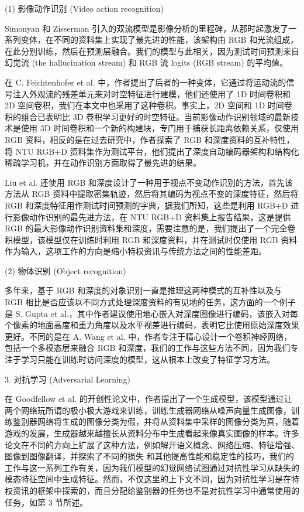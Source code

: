 (1)  影像动作识别 (Video action recognition)

Simonyan 和 Zisserman 引入的双流模型是影像分析的里程碑，从那时起激发了一系列变体，在不同的资料集上实现了最先进的性能，该架构由 RGB 和光流组成，在此分别训练，然后在预测层融合。我们的模型与此相关，因为测试时间预测来自幻觉流 (the hallucination stream) 和 RGB 流 logits (RGB stream) 的平均值。

在 C. Feichtenhofer et al. 中，作者提出了后者的一种变体，它通过将运动流的信号注入外观流的残差单元来对时空特征进行建模，他们还使用了 1D 时间卷积和 2D 空间卷积，我们在本文中也采用了这种卷积。事实上，2D 空间和 1D 时间卷积的组合已表明比 3D 卷积学习更好的时空特征。当前影像动作识别领域的最新技术是使用 3D 时间卷积和一个新的构建块，专门用于捕获长距离依赖关系，仅使用 RGB 资料，相反的是在过去研究中，作者探索了 RGB 和深度资料的互补特性，将 NTU RGB+D 资料集作为测试平台，他们提出了深度自动编码器架构和结构化稀疏学习机，并在动作识别方面取得了最先进的结果。

Liu et al. 还使用 RGB 和深度设计了一种用于视点不变动作识别的方法，首先该方法从 RGB 资料中提取密集轨迹，然后将其编码为视点不变的深度特征，然后将 RGB 和深度特征用作测试时间预测的字典，据我们所知，这些是利用 RGB+D 进行影像动作识别的最先进方法，在 NTU RGB+D 资料集上报告结果，这是提供 RGB 的最大影像动作识别资料集和深度，需要注意的是，我们提出了一个完全卷积模型，该模型仅在训练时利用 RGB 和深度资料，并在测试时仅使用 RGB 资料作为输入，这项工作的方向是缩小特权资讯与传统方法之间的性能差距。

(2) 物体识别 (Object recognition) 

多年来，基于 RGB 和深度的对象识别一直是推理这两种模式的互补性以及与 RGB 相比是否应该以不同方式处理深度资料的有见地的任务，这方面的一个例子是 S. Gupta et al.，其中作者建议使用地心嵌入对深度图像进行编码，该嵌入对每个像素的地面高度和重力角度以及水平视差进行编码，表明它比使用原始深度效果更好。不同的是在  A. Wang et al. 中，作者专注于精心设计一个卷积神经网络，包括一个多模态层来融合 RGB 和深度，我们的工作与这些方法不同，因为我们专注于学习只能在训练时访问深度的模型，这从根本上改变了特征学习方法。

3. 对抗学习 (Adversarial Learning) 

在 Goodfellow et al. 的开创性论文中，作者提出了一个生成模型，该模型通过让两个网络玩所谓的极小极大游戏来训练，训练生成器网络从噪声向量生成图像，训练鉴别器网络将生成的图像分类为假，并将从资料集中采样的图像分类为真，随着游戏的发展，生成器越来越擅长从资料分布中生成看起来像真实图像的样本。许多论文在不同的方向上扩展了这种方法，例如解开语义概念、网络压缩、特征增强、图像到图像翻译，并探索了不同的损失 和其他提高性能和稳定性的技巧，我们的工作与这一系列工作有关，因为我们模型的幻觉网络试图通过对抗性学习从缺失的模态特征空间中生成特征。然而，不仅这里的上下文不同，因为对抗性学习是在特权资讯的框架中探索的，而且分配给鉴别器的任务也不是对抗性学习中通常使用的任务，如第 3 节所述。

